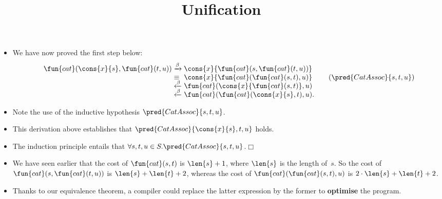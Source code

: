 \documentclass[wide]{slides}
\begin{document}
\begin{slide}
  \title{Unification}

  \begin{itemize}

    \item We have now proved the first step below:
      \begin{equation*}
        \begin{array}{r@{\;}l@{\;}l@{\qquad}r@{}}
          \fun{cat}(\cons{x}{s},\fun{cat}(t,u))
          & \xrightarrow{\beta}
          & \cons{x}{\fun{cat}(s,\fun{cat}(t,u))}\\
          & \equiv
          & \cons{x}{\fun{cat}(\fun{cat}(s,t),u)}
          & (\pred{CatAssoc}{s,t,u})\\
          & \xleftarrow{\smash\beta}
          & \fun{cat}(\cons{x}{\fun{cat}(s,t)},u)\\
          & \xleftarrow{\smash\beta}
          & \fun{cat}(\fun{cat}(\cons{x}{s},t),u).
        \end{array}
      \end{equation*}

    \item Note the use of the inductive hypothesis
      \(\pred{CatAssoc}{s,t,u}\).

    \item This derivation above establishes that
      \(\pred{CatAssoc}{\cons{x}{s},t,u}\) holds.

    \item The induction principle entails that \(\forall s,t,u \in
      S.\pred{CatAssoc}{s,t,u}\).\hfill\(\Box\)

    \item We have seen earlier that the cost of \(\fun{cat}(s,t)\) is
      \(\len{s} + 1\), where \(\len{s}\) is the length of~\(s\). So
      the cost of \(\fun{cat}(s,\fun{cat}(t,u))\) is \(\len{s} +
      \len{t} + 2\), whereas the cost of
      \(\fun{cat}(\fun{cat}(s,t),u)\) is \(2 \cdot \len{s} + \len{t} +
      2\).

    \item Thanks to our equivalence theorem, a compiler could replace
      the latter expression by the former to \textbf{optimise} the
      program.

  \end{itemize}

\end{slide}
\end{document}
